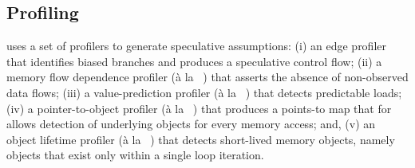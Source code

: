 %
%
%
%
%
%
%
%
%
%

\subsection{Profiling}

\name uses a set of profilers to generate speculative assumptions:
%
(i) an edge profiler~\cite{LLVM:CGO04} that identifies biased
branches and produces a speculative control flow;
%
(ii) a memory flow dependence profiler (\`{a} la
~\cite{chen:04:cc}) that asserts the absence of non-observed data
flows;
%
(iii) a value-prediction profiler (\`{a} la
~\cite{gabbay:97:micro}) that detects predictable loads;
%
(iv) a pointer-to-object profiler (\`{a} la ~\cite{johnson:12:pldi})
that produces a points-to map that for allows detection of underlying objects
for every memory access; and,
%
(v) an object lifetime profiler (\`{a} la ~\cite{johnson:12:pldi})
that detects short-lived memory objects, namely objects that exist only within a
single loop iteration.
%

